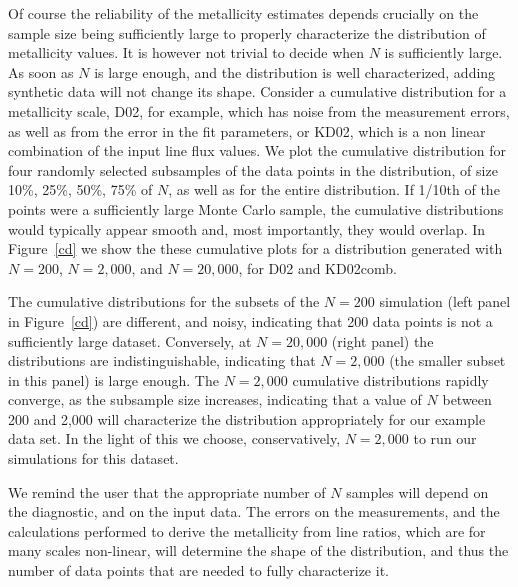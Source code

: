 \documentclass{emulateapj}
\begin{document}
Of course the reliability of the metallicity estimates depends crucially on the sample size being sufficiently large to properly characterize the distribution of metallicity values. It is however not trivial to decide when $N$ is sufficiently large. As soon as $N$ is large enough, and the distribution is well characterized, adding synthetic data will not change its shape. Consider a cumulative distribution for a metallicity scale, D02, for example, which has noise from the measurement errors, as well as from the error in the fit parameters, or KD02, which is a non linear combination of the input line flux values. We plot the cumulative distribution for four randomly selected subsamples of the data points in the distribution, of size 10\%, 25\%, 50\%, 75\% of $N$, as well as for the entire distribution. If 1/10th of the points were a sufficiently large Monte Carlo sample, the cumulative distributions would typically appear smooth and, most importantly, they would overlap. In Figure~\ref{cd} we show the these cumulative plots for a distribution generated with $N=200$, $N=2,000$, and $N=20,000$, for D02 and KD02comb.


The cumulative distributions for the subsets of the $N=200$ simulation (left panel in Figure~\ref{cd}) are different, and noisy, indicating that 200 data points is not a sufficiently large dataset. Conversely, at $N=20,000$ (right panel) the distributions are indistinguishable, indicating that $N=2,000$ (the smaller subset in this panel) is large enough. The $N=2,000$ cumulative distributions rapidly converge, as the subsample size increases, indicating that a value of $N$  between 200 and 2,000 will characterize the distribution appropriately for our example data set.  In the light of this we choose, conservatively, $N=2,000$ to run our simulations for this dataset. 

We remind the user that the appropriate number of $N$ samples will depend on the diagnostic, and on the input data. The errors on the measurements, and the calculations performed to derive the metallicity from line ratios, which are for many scales non-linear, will determine the shape of the distribution, and thus the number of data points that are needed to fully characterize it. 
\end{document}
